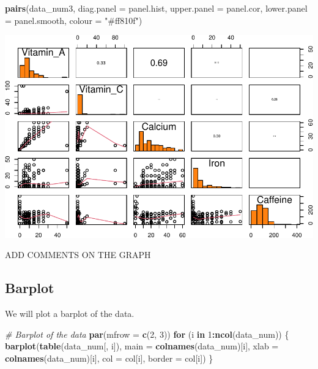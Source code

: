 \documentclass[
]{article}
\newenvironment{Shaded}{\begin{snugshade}}{\end{snugshade}}
\newcommand{\AttributeTok}[1]{\textcolor[rgb]{0.13,0.29,0.53}{#1}}
\newcommand{\CommentTok}[1]{\textcolor[rgb]{0.56,0.35,0.01}{\textit{#1}}}
\newcommand{\ControlFlowTok}[1]{\textcolor[rgb]{0.13,0.29,0.53}{\textbf{#1}}}
\newcommand{\DecValTok}[1]{\textcolor[rgb]{0.00,0.00,0.81}{#1}}
\newcommand{\FunctionTok}[1]{\textcolor[rgb]{0.13,0.29,0.53}{\textbf{#1}}}
\newcommand{\NormalTok}[1]{#1}
\newcommand{\SpecialCharTok}[1]{\textcolor[rgb]{0.81,0.36,0.00}{\textbf{#1}}}
\newcommand{\StringTok}[1]{\textcolor[rgb]{0.31,0.60,0.02}{#1}}
\begin{document}
\begin{Shaded}
\begin{Highlighting}[]
\FunctionTok{pairs}\NormalTok{(data\_num3, }
      \AttributeTok{diag.panel =}\NormalTok{ panel.hist,}
      \AttributeTok{upper.panel =}\NormalTok{ panel.cor,}
      \AttributeTok{lower.panel =}\NormalTok{ panel.smooth,}
      \AttributeTok{colour =} \StringTok{"\#ff810f"}\NormalTok{)}
\end{Highlighting}
\end{Shaded}

\begin{center}\includegraphics{Statistical_Learning_Final_Report_files/figure-latex/pairplot-3} \end{center}

ADD COMMENTS ON THE GRAPH

\subsection{Barplot}\label{barplot}

We will plot a barplot of the data.

\begin{Shaded}
\begin{Highlighting}[]
\CommentTok{\# Barplot of the data}
\FunctionTok{par}\NormalTok{(}\AttributeTok{mfrow =} \FunctionTok{c}\NormalTok{(}\DecValTok{2}\NormalTok{, }\DecValTok{3}\NormalTok{))}
\ControlFlowTok{for}\NormalTok{ (i }\ControlFlowTok{in} \DecValTok{1}\SpecialCharTok{:}\FunctionTok{ncol}\NormalTok{(data\_num)) \{}
  \FunctionTok{barplot}\NormalTok{(}\FunctionTok{table}\NormalTok{(data\_num[, i]), }\AttributeTok{main =} \FunctionTok{colnames}\NormalTok{(data\_num)[i],}
          \AttributeTok{xlab =} \FunctionTok{colnames}\NormalTok{(data\_num)[i], }\AttributeTok{col =}\NormalTok{ col[i], }\AttributeTok{border =}\NormalTok{ col[i])}
\NormalTok{\}}
\end{Highlighting}
\end{Shaded}
\end{document}

